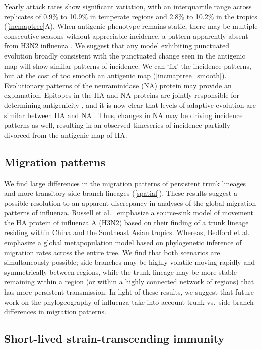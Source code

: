 Yearly attack rates show significant variation, with an interquartile range across replicates of 0.9\% to 10.9\% in temperate regions and 2.8\% to 10.2\% in the tropics (\ref{incmaptree}A).  When antigenic phenotype remains static, there may be multiple consecutive seasons without appreciable incidence, a pattern apparently absent from H3N2 influenza \cite{Finkelman07}.  We suggest that any model exhibiting punctuated evolution broadly consistent with the punctuated change seen in the antigenic map will show similar patterns of incidence.  We can `fix' the incidence patterns, but at the cost of too smooth an antigenic map (\ref{incmaptree_smooth}).  Evolutionary patterns of the neuraminidase (NA) protein may provide an explanation.  Epitopes in the HA and NA proteins are jointly responsible for determining antigenicity \cite{Nelson07NatRevGenet}, and it is now clear that levels of adaptive evolution are similar between HA and NA \cite{Bhatt11}.  Thus, changes in NA may be driving incidence patterns as well, resulting in an observed timeseries of incidence partially divorced from the antigenic map of HA.

\subsection*{Migration patterns}

We find large differences in the migration patterns of persistent trunk lineages and more transitory side branch lineages (\ref{spatial}).  These results suggest a possible resolution to an apparent discrepancy in analyses of the global migration patterns of influenza.  Russell et al.\ \cite{Russell08} emphasize a source-sink model of movement the HA protein of influenza A (H3N2) based on their finding of a trunk lineage residing within China and the Southeast Asian tropics.  Whereas, Bedford et al.\ \cite{Bedford10} emphasize a global metapopulation model based on phylogenetic inference of migration rates across the entire tree.  We find that both scenarios are simultaneously possible; side branches may be highly volatile moving rapidly and symmetrically between regions, while the trunk lineage may be more stable remaining within a region (or within a highly connected network of regions) that has more persistent transmission.  In light of these results, we suggest that future work on the phylogeography of influenza take into account trunk vs.\ side branch differences in migration patterns.

\subsection*{Short-lived strain-transcending immunity}

